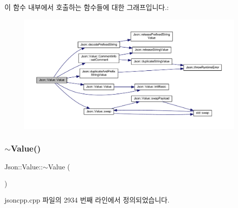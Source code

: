 이 함수 내부에서 호출하는 함수들에 대한 그래프입니다.\+:\nopagebreak
\begin{figure}[H]
\begin{center}
\leavevmode
\includegraphics[width=350pt]{class_json_1_1_value_a436dfd3670f95fd665f680eba5cebcf0_cgraph}
\end{center}
\end{figure}
\mbox{\label{class_json_1_1_value_a287dea48da3912d02756735bf677b27b}} 
\subsubsection{\texorpdfstring{$\sim$\+Value()}{~Value()}}
{\footnotesize\ttfamily Json\+::\+Value\+::$\sim$\+Value (\begin{DoxyParamCaption}{ }\end{DoxyParamCaption})}



jsoncpp.\+cpp 파일의 2934 번째 라인에서 정의되었습니다.


